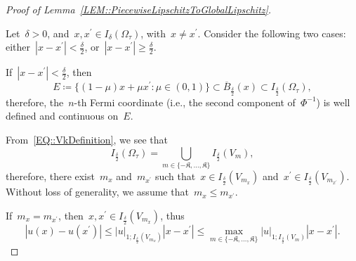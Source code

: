 \documentclass[10pt,a4paper]{amsart}
\makeatletter
\newcommand{\abs}[1]{\left\lvert#1\right\rvert}
\renewcommand{\geq}{\geqslant}
\renewcommand{\leq}{\leqslant}
\newcommand{\prooflabel}[2]{%
  \def\@currentlabelname{#2}%
  \label{#1}%
}
\makeatother
\begin{document}
\begin{proof}[Proof of Lemma~\ref{LEM::PiecewiseLipschitzToGlobalLipschitz}]\prooflabel{PRF::PiecewiseLipschitzToGlobalLipschitz}{Proof of Lemma~\ref{LEM::PiecewiseLipschitzToGlobalLipschitz}}
    Let~$\delta > 0$, and~$x,x^\prime \in I_\delta(\Omega_\tau)$, with~$x \neq x^\prime$. Consider the following two cases: either~$\abs{x-x^\prime} < \frac{\delta}{2}$, or~$\abs{x-x^\prime} \geq \frac{\delta}{2}$.

    If~$\abs{x-x^\prime} < \frac{\delta}{2}$, then
    \begin{equation}\label{EQ::SegmentIsInOmegaDeltaLipschitz}
        E \coloneq \bigg\{(1-\mu)x + \mu x^\prime \colon \mu \in (0,1)\bigg\} \subset \overline{B}_{\frac{\delta}{2}}(x) \subset I_{\frac{\delta}{2}}(\Omega_\tau),
    \end{equation}
    therefore, the~$n$-th Fermi coordinate (i.e., the second component of~$\Phi^{-1}$) is well defined and continuous on~$E$.

    From~\eqref{EQ::VkDefinition}, we see that
    \begin{equation}\label{EQ::OmegaDeltaVkPartitionLipschitz}
        I_{\frac{\delta}{2}}(\Omega_\tau) = \bigcup_{m \in \{-\mathfrak{K}, \dots, \mathfrak{K}\}}I_{\frac{\delta}{2}}(V_m),
    \end{equation}
    therefore, there exist~$m_x$ and~$m_{x^\prime}$ such that~$x \in I_{\frac{\delta}{2}}(V_{m_x})$ and~$x^\prime \in I_{\frac{\delta}{2}}(V_{m_{x^\prime}})$. Without loss of generality, we assume that~$m_x \leq m_{x^\prime}$.

    If~$m_x = m_{x^\prime}$, then~$x,x^\prime \in I_{\frac{\delta}{2}}(V_{m_x})$, thus
    \begin{equation}\label{EQ::xxPrimeNearSameVkLipschitz}
        \abs{u(x)-u(x^\prime)} \leq \abs{u}_{1; I_{\frac{\delta}{2}}(V_{m_x})} \abs{x-x^\prime} \leq \max_{m \in \{-\mathfrak{K},\dots,\mathfrak{K}\}} \abs{u}_{1; I_{\frac{\delta}{2}}(V_m)}\abs{x-x^\prime}.
    \end{equation}


\end{proof}
\end{document}
